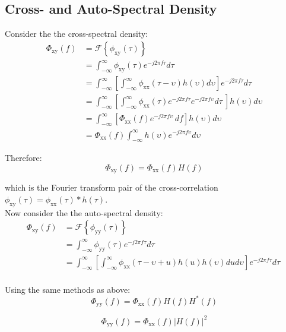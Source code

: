 \documentclass[12pt]{book}
\theoremstyle{definition}
\begin{document}
\subsection{Cross- and Auto-Spectral Density}
Consider the the cross-spectral density:
\[
\begin{split}
    \Phi_\mathrm{xy}(f) & = \mathcal{F} \left \{ \phi_\mathrm{xy}(\tau)\right \}\\
                & = \int_{-\infty}^\infty \phi_\mathrm{xy}(\tau) e^{-j2\pi f \tau} d \tau\\
                & = \int_{-\infty}^\infty \left [ \int_{-\infty}^\infty \phi_\mathrm{xx}(\tau - \upsilon) h(\upsilon) d \upsilon \right ] e^{-j2\pi f \tau} d \tau\ \\
                & = \int_{-\infty}^\infty \left [ \int_{-\infty}^\infty \phi_\mathrm{xx}(\tau) e^{-j2\pi f \tau} e^{-j2\pi f \upsilon} d \tau\ \right ] h(\upsilon) d \upsilon \\
                 & = \int_{-\infty}^\infty \left [ \Phi_\mathrm{xx}(f) e^{-j2\pi f \upsilon} \, d f \right ] h(\upsilon) d \upsilon \\
                 & = \Phi_\mathrm{xx}(f)  \int_{-\infty}^\infty  h(\upsilon) e^{-j2\pi f \upsilon} d \upsilon
\end{split}
\]


Therefore:
\[
\boxed{\Phi_\mathrm{xy}(f)  = \Phi_\mathrm{xx}(f) H(f)}
\]

which is the Fourier transform pair of the cross-correlation \(\phi_\mathrm{xy}(\tau)  = \phi_\mathrm{xx}(\tau) * h(\tau)\).\\

Now consider the the auto-spectral density:
\[
\begin{split}
    \Phi_\mathrm{xy}(f) & = \mathcal{F} \left \{ \phi_\mathrm{yy}(\tau)\right \}\\
                & = \int_{-\infty}^\infty \phi_\mathrm{yy}(\tau) e^{-j2\pi f \tau} d \tau\\
                & = \int_{-\infty}^\infty \left [ \int_{-\infty}^\infty \phi_\mathrm{xx}(\tau - \upsilon +u) h(u) h(\upsilon) du d \upsilon \right ] e^{-j2\pi f \tau} d \tau\ \\
\end{split}
\]

Using the same methods as above:
\[
\Phi_\mathrm{yy}(f)  = \Phi_\mathrm{xx}(f) H(f) H^{*}(f)
\]

\[
\boxed{\Phi_\mathrm{yy}(f)  = \Phi_\mathrm{xx}(f) \left |H(f) \right |^2}
\]
\end{document}
